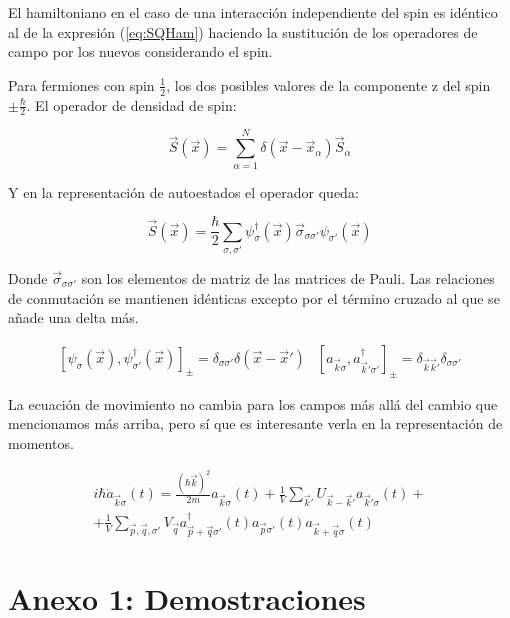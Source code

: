 \documentclass{article} %
\begin{document}
El hamiltoniano en el caso de una interacción independiente del spin es idéntico al de la expresión (\ref{eq:SQHam}) haciendo la sustitución de los operadores de campo por los nuevos considerando el spin.

Para fermiones con spin $\frac{1}{2}$, los dos posibles valores de la componente z del spin $\pm\frac{\hbar}{2}$. El operador de densidad de spin:

$$
\vec{S}(\vec{x})=\sum_{\alpha=1}^N \delta(\vec{x}-\vec{x}_{\alpha}) \vec{S}_{\alpha}
$$

Y en la representación de autoestados el operador queda:

\begin{equation}
\vec{S}(\vec{x}) = \frac{\hbar}{2} \sum_{\sigma, \sigma'} \psi_{\sigma}^{\dagger}(\vec{x}) \vec{\sigma}_{\sigma \sigma'} \psi_{\sigma'}(\vec{x})
\end{equation}

Donde $\vec{\sigma}_{\sigma \sigma'}$ son los elementos de matriz de las matrices de Pauli. Las relaciones de conmutación se mantienen idénticas excepto por el término cruzado al que se añade una delta más.

\begin{equation}
\begin{array}{cc}
[\psi_{\sigma}(\vec{x}), \psi_{\sigma'}^{\dagger}(\vec{x})]_{\pm} = \delta_{\sigma \sigma'} \delta(\vec{x} - \vec{x}') & [a_{\vec{k}\sigma}, a^{\dagger}_{\vec{k}'\sigma'}]_{\pm} = \delta_{\vec{k}\vec{k}'} \delta_{\sigma \sigma'}
\end{array}
\end{equation}

La ecuación de movimiento no cambia para los campos más allá del cambio que mencionamos más arriba, pero sí que es interesante verla en la representación de momentos.

\begin{equation}
\begin{split}
i\hbar\dot{a}_{\vec{k}\sigma}(t) = \frac{(\hbar\vec{k})^2}{2m}a_{\vec{k}\sigma}(t)+\frac{1}{V}\sum_{\vec{k}'}U_{\vec{k}-\vec{k}'}a_{\vec{k}'\sigma}(t)+ \\ +\frac{1}{V}\sum_{\vec{p},\vec{q},\sigma'}V_{\vec{q}}a^{\dagger}_{\vec{p}+\vec{q}\sigma'}(t)a_{\vec{p}\sigma'}(t)a_{\vec{k}+\vec{q}\sigma}(t)
\end{split}
\end{equation}

\section{Anexo 1: Demostraciones}
\end{document}
